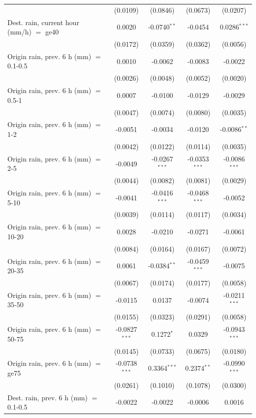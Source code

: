 \begin{tabular}{lcccc}
    & (0.0109) & (0.0846) & (0.0673) & (0.0207)\\
   Dest. rain, current hour (mm/h) $=$ ge40 & 0.0020 & -0.0740$^{**}$ & -0.0454 & 0.0286$^{***}$\\
    & (0.0172) & (0.0359) & (0.0362) & (0.0056)\\
   Origin rain, prev. 6 h (mm) $=$ 0.1-0.5 & 0.0010 & -0.0062 & -0.0083 & -0.0022\\
    & (0.0026) & (0.0048) & (0.0052) & (0.0020)\\
   Origin rain, prev. 6 h (mm) $=$ 0.5-1 & 0.0007 & -0.0100 & -0.0129 & -0.0029\\
    & (0.0047) & (0.0074) & (0.0080) & (0.0035)\\
   Origin rain, prev. 6 h (mm) $=$ 1-2 & -0.0051 & -0.0034 & -0.0120 & -0.0086$^{**}$\\
    & (0.0042) & (0.0122) & (0.0114) & (0.0035)\\
   Origin rain, prev. 6 h (mm) $=$ 2-5 & -0.0049 & -0.0267$^{***}$ & -0.0353$^{***}$ & -0.0086$^{***}$\\
    & (0.0044) & (0.0082) & (0.0081) & (0.0029)\\
   Origin rain, prev. 6 h (mm) $=$ 5-10 & -0.0041 & -0.0416$^{***}$ & -0.0468$^{***}$ & -0.0052\\
    & (0.0039) & (0.0114) & (0.0117) & (0.0034)\\
   Origin rain, prev. 6 h (mm) $=$ 10-20 & 0.0028 & -0.0210 & -0.0271 & -0.0061\\
    & (0.0084) & (0.0164) & (0.0167) & (0.0072)\\
   Origin rain, prev. 6 h (mm) $=$ 20-35 & 0.0061 & -0.0384$^{**}$ & -0.0459$^{***}$ & -0.0075\\
    & (0.0067) & (0.0174) & (0.0177) & (0.0058)\\
   Origin rain, prev. 6 h (mm) $=$ 35-50 & -0.0115 & 0.0137 & -0.0074 & -0.0211$^{***}$\\
    & (0.0155) & (0.0323) & (0.0291) & (0.0058)\\
   Origin rain, prev. 6 h (mm) $=$ 50-75 & -0.0827$^{***}$ & 0.1272$^{*}$ & 0.0329 & -0.0943$^{***}$\\
    & (0.0145) & (0.0733) & (0.0675) & (0.0180)\\
   Origin rain, prev. 6 h (mm) $=$ ge75 & -0.0738$^{***}$ & 0.3364$^{***}$ & 0.2374$^{**}$ & -0.0990$^{***}$\\
    & (0.0261) & (0.1010) & (0.1078) & (0.0300)\\
   Dest. rain, prev. 6 h (mm) $=$ 0.1-0.5 & -0.0022 & -0.0022 & -0.0006 & 0.0016\\

\end{tabular}
